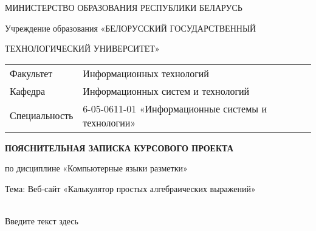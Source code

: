 \documentclass{article}
\begin{document}
    \begin{titlepage}

        \Large

        \begin{center}
            
            
            МИНИСТЕРСТВО ОБРАЗОВАНИЯ РЕСПУБЛИКИ БЕЛАРУСЬ

            Учреждение образования «БЕЛОРУССКИЙ ГОСУДАРСТВЕННЫЙ 

            ТЕХНОЛОГИЧЕСКИЙ УНИВЕРСИТЕТ»

        \end{center}
        
        \vspace{1cm}
        
        \begin{tabular}{ll}
            Факультет & Информационных технологий \\
            Кафедра & Информационных систем и технологий \\
            Специальность & 6-05-0611-01 «Информационные системы и технологии» \\
        \end{tabular}

        \vspace{1cm}
        
        \begin{center}
            {\bfseries ПОЯСНИТЕЛЬНАЯ ЗАПИСКА КУРСОВОГО ПРОЕКТА}
        \end{center}

        \vspace{1cm}
        
        по дисциплине «Компьютерные языки разметки»

        Тема: Веб-сайт «Калькулятор простых алгебраических выражений»
        
        \vspace{2cm}
        
        \begin{minipage}{0.5\textwidth}
        \underline{\hspace{2cm}} \\
        \footnotesize{Введите текст здесь}
        \end{minipage}



\end{titlepage}
\end{document}
